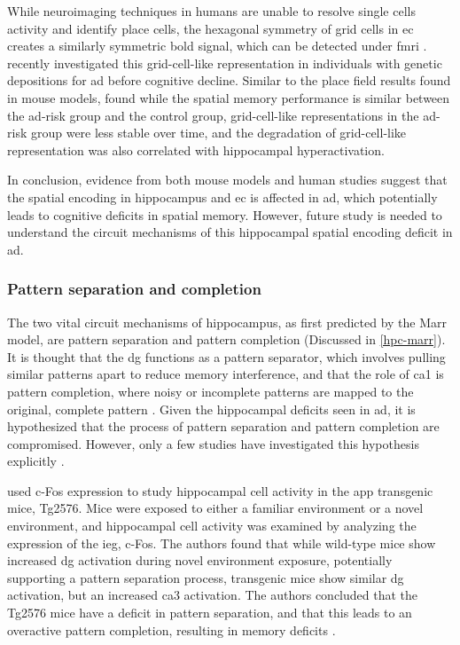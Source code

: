 While neuroimaging techniques in humans are unable to resolve single cells activity and identify place cells, the hexagonal symmetry of grid cells in \gls{ec} creates a similarly symmetric \gls{bold} signal, which can be detected under \gls{fmri} \citep{doeller10}. \citet{kunz15} recently investigated this grid-cell-like representation in individuals with genetic depositions for \gls{ad} before cognitive decline. Similar to the place field results found in mouse models, \citet{kunz15} found while the spatial memory performance is similar between the \gls{ad}-risk group and the control group, grid-cell-like representations in the \gls{ad}-risk group were less stable over time, and the degradation of grid-cell-like representation was also correlated with hippocampal hyperactivation. 

In conclusion, evidence from both mouse models and human studies suggest that the spatial encoding in hippocampus and \gls{ec} is affected in \gls{ad}, which potentially leads to cognitive deficits in spatial memory. However, future study is needed to understand the circuit mechanisms of this hippocampal spatial encoding deficit in \gls{ad}.

\subsubsection{Pattern separation and completion}
The two vital circuit mechanisms of hippocampus, as first predicted by the Marr model, are pattern separation and pattern completion (Discussed in \ref{hpc-marr}). It is thought that the \gls{dg} functions as a pattern separator, which involves pulling similar patterns apart to reduce memory interference, and that the role of \gls{ca1} is pattern completion, where noisy or incomplete patterns are mapped to the original, complete pattern \citep{rolls13}. Given the hippocampal deficits seen in \gls{ad}, it is hypothesized that the process of pattern separation and pattern completion are compromised. However, only a few studies have investigated this hypothesis explicitly \citep{maruszak14}. 

\citet{palmer11} used c-Fos expression to study hippocampal cell activity in the \gls{app} transgenic mice, Tg2576. Mice were exposed to either a familiar environment or a novel environment, and hippocampal cell activity was examined by analyzing the expression of the \gls{ieg}, c-Fos. The authors found that while wild-type mice show increased \gls{dg} activation during novel environment exposure, potentially supporting a pattern separation process, transgenic mice show similar \gls{dg} activation, but an increased \gls{ca3} activation. The authors concluded that the Tg2576 mice have a deficit in pattern separation, and that this leads to an overactive pattern completion, resulting in memory deficits \citep{palmer11}.

